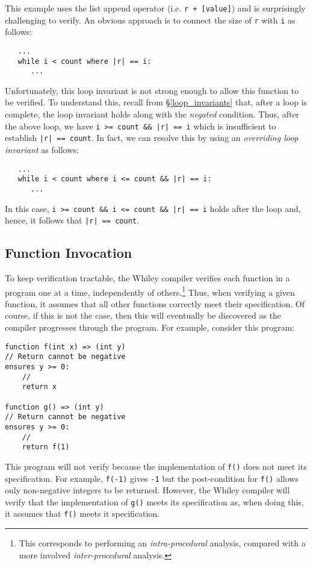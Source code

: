 This example uses the list append operator (i.e. \lstinline{r + [value]})
 and is surprisingly challenging to verify.  An obvious
approach is to connect the size of \lstinline{r} with \lstinline{i} as
follows:

\begin{lstlisting}
   ...
   while i < count where |r| == i:
      ...
\end{lstlisting}

Unfortunately, this loop invariant is not strong enough to allow this
function to be verified.  To understand this, recall from
\S\ref{loop_invariants} that, after a loop is complete, the loop
invariant holds along with the {\em negated} condition.  Thus, after
the above loop, we have \lstinline{i >= count && |r| == i} which is
insufficient to establish \lstinline{|r| == count}.  In fact, we can
resolve this by using an {\em overriding loop invariant} as follows:

\begin{lstlisting}
   ...
   while i < count where i <= count && |r| == i:
      ...
\end{lstlisting}

In this case, \lstinline{i >= count && i <= count && |r| == i} holds
after the loop and, hence, it follows that \lstinline{|r| == count}.

\subsection{Function Invocation}

To keep verification tractable, the Whiley compiler verifies each
function in a program one at a time, independently of
others.\footnote{This corresponds to performing an {\em
    intra-procedural} analysis, compared with a more involved {\em
    inter-procedural} analysis.}  Thus, when verifying a given
function, it assumes that all other functions correctly meet their
specification.  Of course, if this is not the case, then this will
eventually be discovered as the compiler progresses through the
program.  For example, consider this program:

\begin{lstlisting}
function f(int x) => (int y)
// Return cannot be negative
ensures y >= 0:
    //
    return x

function g() => (int y)
// Return cannot be negative
ensures y >= 0:
    //
    return f(1)
\end{lstlisting}

This program will not verify because the implementation of
\lstinline{f()} does not meet its specification.  For example,
\lstinline{f(-1)} gives \lstinline{-1} but the post-condition for
\lstinline{f()} allows only non-negative integers to be returned.
However, the Whiley compiler will verify that the implementation of
\lstinline{g()} meets its specification as, when doing this, it
assumes that \lstinline{f()} meets it specification.

